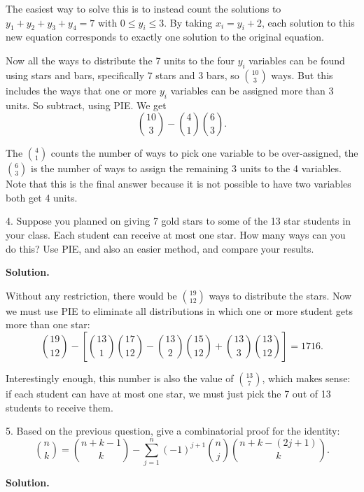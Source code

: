 \documentclass[10pt,]{book}
\theoremstyle{plain}
\theoremstyle{definition}
\theoremstyle{definition}
\theoremstyle{definition}
\numberwithin{equation}{section}
\begin{document}
\begin{exerciselist}
            The easiest way to solve this is to instead count the solutions to \(y_1 + y_2 + y_3 + y_4 = 7\) with \(0 \le y_i \le 3\). By taking \(x_i = y_i+2\), each solution to this new equation corresponds to exactly one solution to the original equation.
\par

            Now all the ways to distribute the 7 units to the four \(y_i\) variables can be found using stars and bars, specifically 7 stars and 3 bars,
            so \({10 \choose 3}\) ways. But this includes the ways that one or more \(y_i\) variables can be assigned more than 3 units. So subtract, using PIE. We get
            \begin{equation*}
              {10 \choose 3} - {4\choose 1} {6 \choose 3}.
            \end{equation*}
\par

            The \({4 \choose 1}\) counts the number of ways to pick one variable to be over-assigned, the \({6 \choose 3}\) is the number of ways to assign the remaining 3 units to the 4 variables.  Note that this is the final answer because it is not possible to have two variables both get 4 units.
\item[4.]\hypertarget{exercise-95}{}
            Suppose you planned on giving 7 gold stars to some of the 13 star students in your class. Each student can receive at most one star. How many ways can you do this? Use PIE, and also an easier method, and compare your results.
\par\smallskip
\par\smallskip
\noindent\textbf{Solution.}\hypertarget{solution-146}{}\quad

            Without any restriction, there would be \({19\choose 12}\) ways to distribute the stars. Now we must use PIE to eliminate all distributions in which one or more student gets more than one star:
            \begin{equation*}
              {19 \choose 12} - \left[{13 \choose 1}{17 \choose 12} - {13\choose 2}{15 \choose 12} + {13\choose 3}{13 \choose 12}\right] = 1716.
            \end{equation*}
\par

            Interestingly enough, this number is also the value of \({13 \choose 7}\), which makes sense: if each student can have at most one star, we must just pick the 7 out of 13 students to receive them.
\item[5.]\hypertarget{exercise-96}{}
            Based on the previous question, give a combinatorial proof for the identity:
            \begin{equation*}
              {n \choose k} = {n+k-1 \choose k} - \sum_{j=1}^n (-1)^{j+1}{n \choose j}{n+k-(2j+1) \choose k}.
            \end{equation*}
\par\smallskip
\par\smallskip
\noindent\textbf{Solution.}\hypertarget{solution-147}{}\quad


\end{exerciselist}
\end{document}
